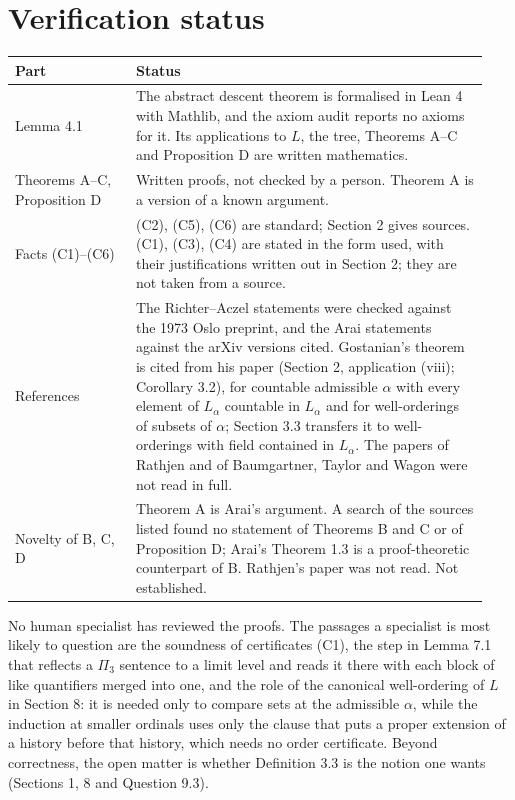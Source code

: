 \documentclass[11pt]{article}
\begin{document}
\section{Verification status}

\begin{center}\begin{tabular}{p{0.24\linewidth}p{0.70\linewidth}}
\toprule
Part & Status \\
\midrule
Lemma 4.1 & The abstract descent theorem is formalised in Lean 4 with Mathlib, and the axiom audit reports no axioms
for it. Its applications to $L$, the tree, Theorems A--C and Proposition D are written mathematics. \\
Theorems A--C, Proposition D & Written proofs, not checked by a person. Theorem A is a version of a known
argument. \\
Facts (C1)--(C6) & (C2), (C5), (C6) are standard; Section 2 gives sources. (C1), (C3), (C4) are stated in the form used, with their
justifications written out in Section 2; they are not taken from a source. \\
References & The Richter--Aczel statements were checked against the 1973 Oslo preprint, and the Arai statements
against the arXiv versions cited. Gostanian's theorem is cited from his paper (Section 2, application (viii); Corollary 3.2), for countable admissible $\alpha$ with every element of
$L_{\alpha}$ countable in $L_{\alpha}$ and for well-orderings of subsets of $\alpha$; Section 3.3 transfers it to
well-orderings with field contained in $L_{\alpha}$. The papers of Rathjen and of Baumgartner, Taylor and Wagon were not read in full. \\
Novelty of B, C, D & Theorem A is Arai's argument. A search of the sources listed found no statement of Theorems B
and C or of Proposition D; Arai's Theorem 1.3 is a proof-theoretic counterpart of B. Rathjen's paper was not read.
Not established. \\
\bottomrule
\end{tabular}\end{center}

No human specialist has reviewed the proofs. The passages a specialist is most likely to question are the soundness of
certificates (C1), the step in Lemma 7.1 that reflects a $\Pi_3$ sentence to a limit level and reads it there with each block of like
quantifiers merged into one, and the role of the
canonical well-ordering of $L$ in Section 8: it is needed only to compare sets at the admissible $\alpha$, while the
induction at smaller ordinals uses only the clause that puts a proper extension of a history before that history,
which needs no order certificate. Beyond correctness, the open matter is whether Definition 3.3 is the notion one wants (Sections 1, 8
and Question 9.3).
\end{document}
